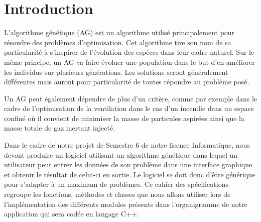 \documentclass[a4paper,11pt]{article}
\title{\vspace{13em}{\huge Cahier des Spécifications}}
\author{Edouard Fouassier - Maxime Gonthier - Benjamin Guillot\\
		Laureline Martin - Rémi Navarro - Lydia Rodrigez de la Nava
		\vspace{2em}\\
		Algorithme Génétique
		\vspace{2em}}
\begin{document}
	
	\clearpage
	\maketitle\vspace{13em}
\newpage
\tableofcontents
\newpage\clearpage{}
	
	\section{Introduction}
		L’algorithme génétique (AG) est un algorithme utilisé principalement pour résoudre des problèmes d’optimisation. 
		Cet algorithme tire son nom de sa particularité à s’inspirer de l’évolution des espèces dans leur cadre naturel.
		Sur le même principe, un AG va faire évoluer une population dans le but d’en améliorer les individus sur plusieurs générations.
		Les solutions seront généralement différentes mais auront pour particularité de toutes répondre au problème posé.

		Un AG peut également dépendre de plus d'un critère, comme par exemple dans le cadre de l'optimisation de la ventilation dans le cas d’un incendie dans un espace confiné où il convient de minimiser la masse de particules aspirées ainsi que la masse totale de gaz inertant injecté.

		Dans le cadre de notre projet de Semestre 6 de notre licence Informatique, nous devont produire un logiciel utilisant un algorithme génétique dans lequel un utilisateur peut entrer les données de son problème dans une interface graphique et obtenir le résultat de celui-ci en sortie. Le logiciel se doit donc d'être générique pour s'adapter à un maximum de problèmes.
		Ce cahier des spécifications regroupe les fonctions, méthodes et classes que nous allons utiliser lors de l’implémentation des différents modules présents dans l'organigramme de notre application qui sera codée en langage C++.
\end{document}
